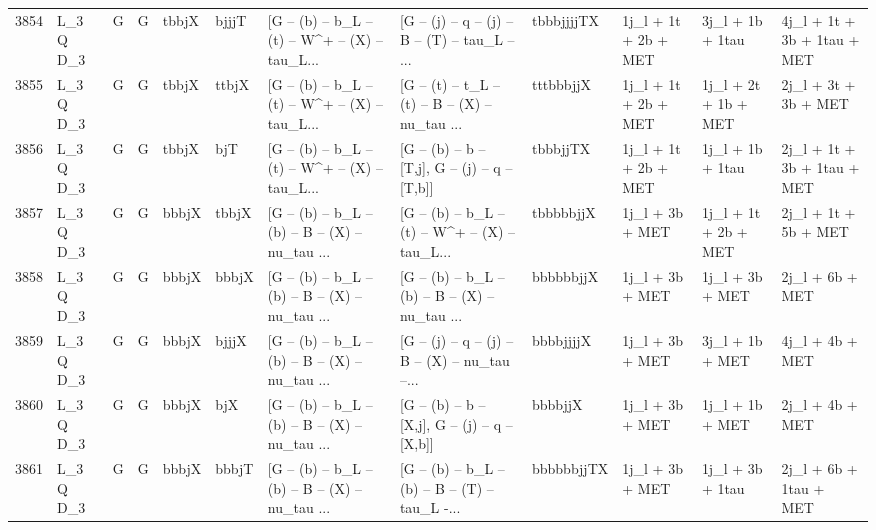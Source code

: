 \begin{tabular}{llllllllllll}
3854 &    L\_3 Q D\_3 &     G &     G &       tbbjX &       bjjjT &  [G -- (b) -- b\_L -- (t) -- W\textasciicircum + -- (X) -- tau\_L... &  [G -- (j) -- q -- (j) -- B -- (T) -- tau\_L -- ... &  tbbbjjjjTX &     1j\_l + 1t + 2b + MET &         3j\_l + 1b + 1tau &        4j\_l + 1t + 3b + 1tau + MET \\
3855 &    L\_3 Q D\_3 &     G &     G &       tbbjX &       ttbjX &  [G -- (b) -- b\_L -- (t) -- W\textasciicircum + -- (X) -- tau\_L... &  [G -- (t) -- t\_L -- (t) -- B -- (X) -- nu\_tau ... &   tttbbbjjX &     1j\_l + 1t + 2b + MET &     1j\_l + 2t + 1b + MET &               2j\_l + 3t + 3b + MET \\
3856 &    L\_3 Q D\_3 &     G &     G &       tbbjX &         bjT &  [G -- (b) -- b\_L -- (t) -- W\textasciicircum + -- (X) -- tau\_L... &   [G -- (b) -- b -- [T,j], G -- (j) -- q -- [T,b]] &    tbbbjjTX &     1j\_l + 1t + 2b + MET &         1j\_l + 1b + 1tau &        2j\_l + 1t + 3b + 1tau + MET \\
3857 &    L\_3 Q D\_3 &     G &     G &       bbbjX &       tbbjX &  [G -- (b) -- b\_L -- (b) -- B -- (X) -- nu\_tau ... &  [G -- (b) -- b\_L -- (t) -- W\textasciicircum + -- (X) -- tau\_L... &   tbbbbbjjX &          1j\_l + 3b + MET &     1j\_l + 1t + 2b + MET &               2j\_l + 1t + 5b + MET \\
3858 &    L\_3 Q D\_3 &     G &     G &       bbbjX &       bbbjX &  [G -- (b) -- b\_L -- (b) -- B -- (X) -- nu\_tau ... &  [G -- (b) -- b\_L -- (b) -- B -- (X) -- nu\_tau ... &   bbbbbbjjX &          1j\_l + 3b + MET &          1j\_l + 3b + MET &                    2j\_l + 6b + MET \\
3859 &    L\_3 Q D\_3 &     G &     G &       bbbjX &       bjjjX &  [G -- (b) -- b\_L -- (b) -- B -- (X) -- nu\_tau ... &  [G -- (j) -- q -- (j) -- B -- (X) -- nu\_tau --... &   bbbbjjjjX &          1j\_l + 3b + MET &          3j\_l + 1b + MET &                    4j\_l + 4b + MET \\
3860 &    L\_3 Q D\_3 &     G &     G &       bbbjX &         bjX &  [G -- (b) -- b\_L -- (b) -- B -- (X) -- nu\_tau ... &   [G -- (b) -- b -- [X,j], G -- (j) -- q -- [X,b]] &     bbbbjjX &          1j\_l + 3b + MET &          1j\_l + 1b + MET &                    2j\_l + 4b + MET \\
3861 &    L\_3 Q D\_3 &     G &     G &       bbbjX &       bbbjT &  [G -- (b) -- b\_L -- (b) -- B -- (X) -- nu\_tau ... &  [G -- (b) -- b\_L -- (b) -- B -- (T) -- tau\_L -... &  bbbbbbjjTX &          1j\_l + 3b + MET &         1j\_l + 3b + 1tau &             2j\_l + 6b + 1tau + MET \\

\end{tabular}
